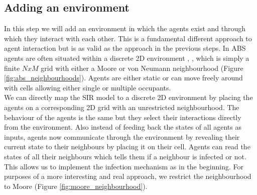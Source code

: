 \subsection{Adding an environment}
\label{sec:step5_environment}
In this step we will add an environment in which the agents exist and through which they interact with each other. This is a fundamental different approach to agent interaction but is as valid as the approach in the previous steps.
In ABS agents are often situated within a discrete 2D environment \cite{schelling_dynamic_1971}, \cite{epstein_growing_1996}, \cite{epstein_agent_zero:_2014} which is simply a finite $N x M$ grid with either a Moore or von Neumann neighbourhood (Figure \ref{fig:abs_neighbourhoods}). Agents are either static or can move freely around with cells allowing either single or multiple occupants. \\
We can directly map the SIR model to a discrete 2D environment by placing the agents on a corresponding 2D grid with an unrestricted neighbourhood. The behaviour of the agents is the same but they select their interactions directly from the environment. Also instead of feeding back the states of all agents as inputs, agents now communicate through the environment by revealing their current state to their neighbours by placing it on their cell. Agents can read the states of all their neighbours which tells them if a neighbour is infected or not. This allows us to implement the infection mechanism as in the beginning. For purposes of a more interesting and real approach, we restrict the neighbourhood to Moore (Figure \ref{fig:moore_neighbourhood}).

